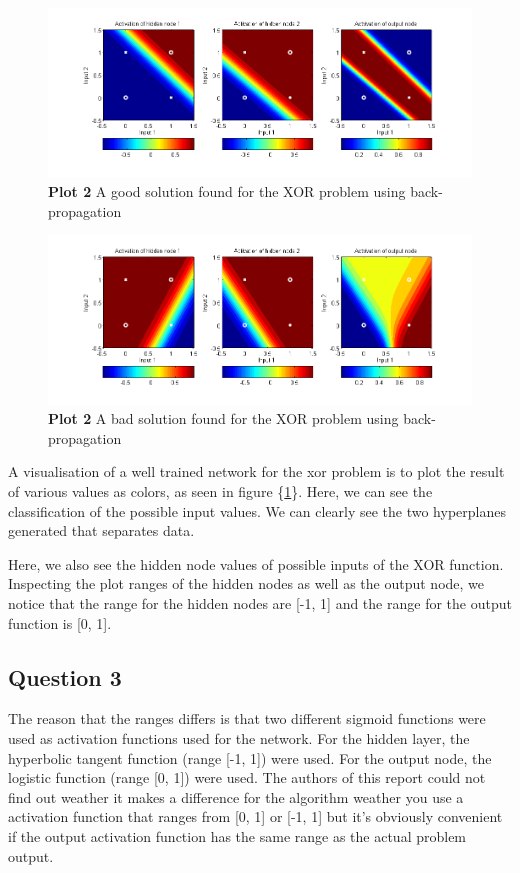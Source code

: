 \documentclass[a4paper]{article}
\begin{document}
\begin{figure}[h!] %
	\includegraphics[scale=0.55]{good_bprop_xor_plot.png}
	\caption{\label{fig:good_bprop_xor_plot}\textbf{Plot 2} A good solution found for the XOR problem using back-propagation}
\end{figure}
\begin{figure}[h!] %
	\includegraphics[scale=0.55]{bad_bprop_xor_plot.png}
	\caption{\label{fig:bad_bprop_xor_plot}\textbf{Plot 2} A bad solution found for the XOR problem using back-propagation}
\end{figure}
A visualisation of a well trained network for the xor problem  
is to plot the result of various values 
as colors, as seen in figure \{\ref{fig:good_bprop_xor_plot}\}. 
Here, we can see the classification of the possible input values. We can 
clearly see the two hyperplanes generated that separates data. 

Here, we also see the hidden node values of possible inputs of the XOR function.
Inspecting the plot ranges of the hidden nodes as well as the output node, we notice that
the range for the hidden nodes are [-1, 1] and the range for the output function is [0, 1].
\subsection*{Question 3}
The reason that the ranges differs is that two 
different sigmoid functions were used as activation functions used for the network. 
For the hidden layer, the hyperbolic tangent function (range [-1, 1]) were used. 
For the output node, the logistic function (range [0, 1]) were used. The authors of 
this report could not find out weather it makes a difference for the algorithm weather 
you use a activation function that ranges from [0, 1] or [-1, 1] but it's obviously 
convenient if the output activation function has the same range as the actual problem 
output. 
\end{document}
